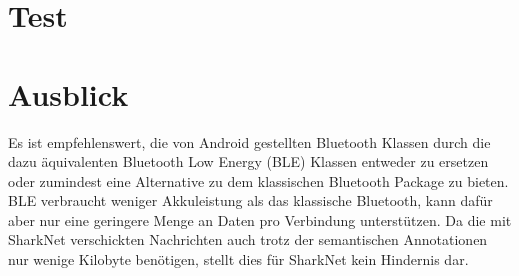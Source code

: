 \section{Test}



\section{Ausblick}
Es ist empfehlenswert, die von Android gestellten Bluetooth Klassen durch die dazu äquivalenten Bluetooth Low Energy (BLE) Klassen entweder zu ersetzen oder zumindest eine Alternative zu dem klassischen Bluetooth Package zu bieten. BLE verbraucht weniger Akkuleistung als das klassische Bluetooth, kann dafür aber nur eine geringere Menge an Daten pro Verbindung unterstützen. Da die mit SharkNet verschickten Nachrichten auch trotz der semantischen Annotationen nur wenige Kilobyte benötigen, stellt dies für SharkNet kein Hindernis dar.

